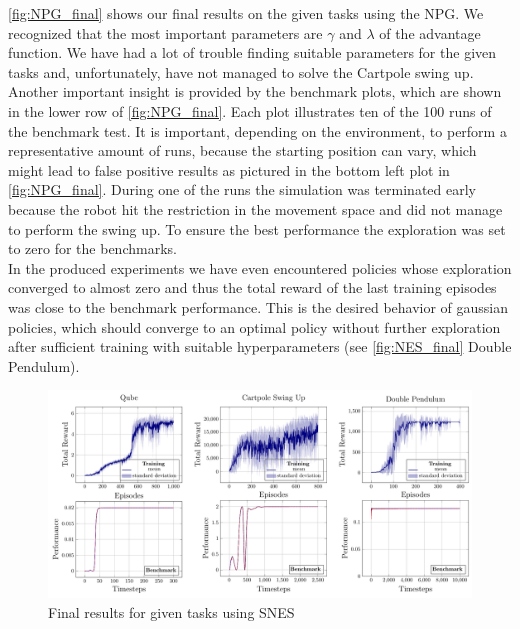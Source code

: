 \autoref{fig:NPG_final} shows our final results on the given tasks using the NPG. We recognized that the most important parameters are $\gamma$ and $\lambda$ of the advantage function. We have had a lot of trouble finding suitable parameters for the given tasks and, unfortunately, have not managed to solve the Cartpole swing up. \\
Another important insight is provided by the benchmark plots, which are shown in the lower row of \autoref{fig:NPG_final}. Each plot illustrates ten of the 100 runs of the benchmark test. It is important, depending on the environment, to perform a representative amount of runs, because the starting position can vary, which might lead to false positive results as pictured in the bottom left plot in \autoref{fig:NPG_final}. During one of the runs the simulation was terminated early because the robot hit the restriction in the movement space and did not manage to perform the swing up. To ensure the best performance the exploration was set to zero for the benchmarks. \\
In the produced experiments we have even encountered policies whose exploration converged to almost zero and thus the total reward of the last training episodes was close to the benchmark performance. This is the desired behavior of gaussian policies, which should converge to an optimal policy without further exploration after sufficient training with suitable hyperparameters (see \autoref{fig:NES_final} Double Pendulum). \\

\begin{figure}
\centering
\includegraphics[width=\textwidth]{plots/learned_benchmarked_NES.pdf}
\caption{Final results for given tasks using SNES}
\label{fig:NES_final}
\end{figure}

